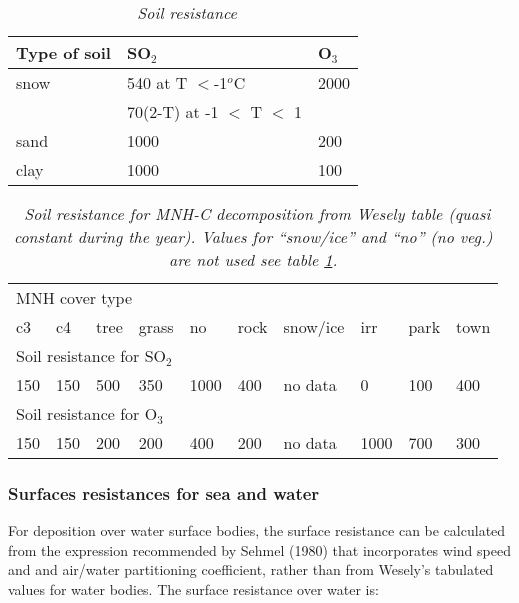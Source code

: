 \begin{table}
\begin{center}
\begin{tabular}{lll}\hline
Type of soil & SO$_2$                    & O$_3$  \\ \hline
snow           & 540 at T $ < $-1$^o$C      & 2000   \\ 
               & 70(2-T) at -1 $<$ T $<$ 1 &        \\ 
sand           & 1000                      & 200    \\ 
clay           & 1000                      & 100    \\  \hline
\end{tabular}
\caption{\sl ~{Soil resistance}}
\label{rsol}
\end{center}
\end{table}

\begin{table}
\begin{center}
\begin{tabular}{llllllllll}\hline
\multicolumn{10}{l}{MNH cover type}\\
 c3 & c4 & tree & grass & no & rock & snow/ice & irr & park & town \\ 
\hline
\multicolumn{10}{l}{Soil resistance for SO$_2$}\\
150 & 150 & 500 & 350 & 1000 & 400 & no data & 0 & 100 & 400 \\
\hline
\multicolumn{10}{l}{Soil resistance for O$_3$}\\
150 & 150 & 200 & 200 & 400 & 200 & no data & 1000 & 700 & 300 \\
\hline  
\end{tabular}
\caption{\sl ~{Soil resistance for MNH-C decomposition from Wesely
table (quasi constant during the year). Values for ``snow/ice'' and
``no'' (no veg.) are not used see table \ref{rsol}.}} 
\label{rcsoil}
\end{center}
\end{table}

\subsubsection{Surfaces resistances for sea and water}
For deposition over water surface bodies, the surface resistance can
be calculated from the expression recommended by Sehmel (1980) that
incorporates wind speed and 
and air/water partitioning coefficient, rather than from Wesely's
tabulated values for water bodies. The surface resistance over water
is: 


